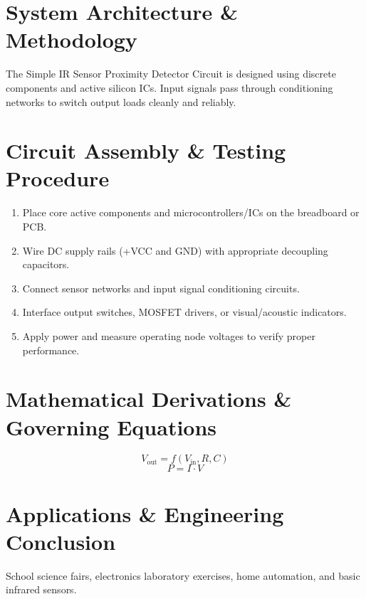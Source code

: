 \documentclass[11pt,a4paper]{article}
\begin{document}
\section{System Architecture \& Methodology}
The Simple IR Sensor Proximity Detector Circuit is designed using discrete components and active silicon ICs. Input signals pass through conditioning networks to switch output loads cleanly and reliably.

\section{Circuit Assembly \& Testing Procedure}
\begin{enumerate}
    \item Place core active components and microcontrollers/ICs on the breadboard or PCB.
    \item Wire DC supply rails (+VCC and GND) with appropriate decoupling capacitors.
    \item Connect sensor networks and input signal conditioning circuits.
    \item Interface output switches, MOSFET drivers, or visual/acoustic indicators.
    \item Apply power and measure operating node voltages to verify proper performance.
\end{enumerate}

\section{Mathematical Derivations \& Governing Equations}
\begin{equation}
V_{\text{out}} = f(V_{\text{in}}, R, C)
\end{equation}
\begin{equation}
P = I \cdot V
\end{equation}

\section{Applications \& Engineering Conclusion}
School science fairs, electronics laboratory exercises, home automation, and basic infrared sensors.
\end{document}
